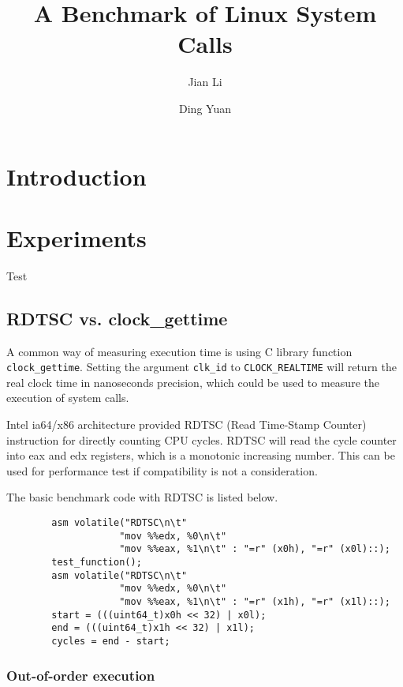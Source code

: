 \documentclass{article}
\begin{document}
\title{A Benchmark of Linux System Calls}
\author{Jian Li \and Ding Yuan}
\maketitle

\section{Introduction}


\section{Experiments}

Test 

\subsection{RDTSC vs. clock\_gettime}

A common way of measuring execution time is using C library function \lstinline{clock_gettime}.
Setting the argument \lstinline{clk_id} to \lstinline{CLOCK_REALTIME} will return the real clock time in nanoseconds precision,
which could be used to measure the execution of system calls.

Intel ia64/x86 architecture provided RDTSC (Read Time-Stamp Counter) instruction for directly counting CPU cycles. 
RDTSC will read the cycle counter into eax and edx registers, which is a monotonic increasing number.
This can be used for performance test if compatibility is not a consideration.

The basic benchmark code with RDTSC is listed below.

\begin{verbatim}
        asm volatile("RDTSC\n\t"
                    "mov %%edx, %0\n\t"
                    "mov %%eax, %1\n\t" : "=r" (x0h), "=r" (x0l)::);
        test_function();
        asm volatile("RDTSC\n\t"
                    "mov %%edx, %0\n\t"
                    "mov %%eax, %1\n\t" : "=r" (x1h), "=r" (x1l)::);
        start = (((uint64_t)x0h << 32) | x0l);
        end = (((uint64_t)x1h << 32) | x1l);
        cycles = end - start;
\end{verbatim}

\subsubsection{Out-of-order execution}
\end{document}
